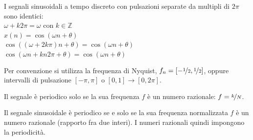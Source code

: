 I segnali sinusoidali a tempo discreto con pulsazioni separate da multipli di $2\pi$ sono identici: \\
$\omega + k2\pi = \omega$ con $k \in \mathbb{Z}$ \\
$x(n) = \cos(\omega n + \theta)$ \\
$\cos((\omega + 2k\pi)n + \theta) = \cos(\omega n + \theta)$ \\
$\cos(\omega n + kn2\pi + \theta) = \cos(\omega n + \theta)$

Per convenzione si utilizza la frequenza di Nyquist, $f_n = [-\nicefrac{1}{2}, \nicefrac{1}{2}]$, oppure intervalli di pulsazione $[-\pi, \pi]$ o $[0, 1] \rightarrow [0, 2\pi]$.

Il segnale è periodico solo se la sua frequenza $f$ è un numero razionale: $f = \nicefrac{k}{N}$.



Il segnale sinusoidale è periodico se e solo se la sua frequenza normalizzata $f$ è un numero razionale (rapporto fra due interi). I numeri razionali quindi impongono la periodicità. 
